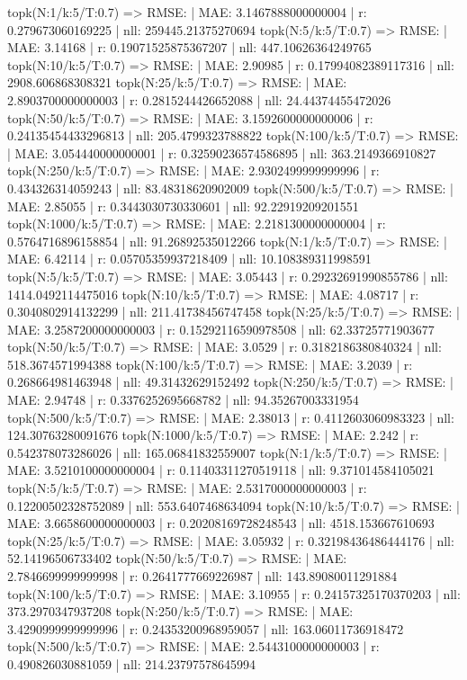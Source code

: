topk(N:1/k:5/T:0.7) => RMSE: | MAE: 3.1467888000000004 | r: 0.279673060169225 | nll: 259445.21375270694
topk(N:5/k:5/T:0.7) => RMSE: | MAE: 3.14168 | r: 0.19071525875367207 | nll: 447.10626364249765
topk(N:10/k:5/T:0.7) => RMSE: | MAE: 2.90985 | r: 0.17994082389117316 | nll: 2908.606868308321
topk(N:25/k:5/T:0.7) => RMSE: | MAE: 2.8903700000000003 | r: 0.2815244426652088 | nll: 24.44374455472026
topk(N:50/k:5/T:0.7) => RMSE: | MAE: 3.1592600000000006 | r: 0.24135454433296813 | nll: 205.4799323788822
topk(N:100/k:5/T:0.7) => RMSE: | MAE: 3.054440000000001 | r: 0.32590236574586895 | nll: 363.2149366910827
topk(N:250/k:5/T:0.7) => RMSE: | MAE: 2.9302499999999996 | r: 0.434326314059243 | nll: 83.48318620902009
topk(N:500/k:5/T:0.7) => RMSE: | MAE: 2.85055 | r: 0.3443030730330601 | nll: 92.22919209201551
topk(N:1000/k:5/T:0.7) => RMSE: | MAE: 2.2181300000000004 | r: 0.5764716896158854 | nll: 91.26892535012266
topk(N:1/k:5/T:0.7) => RMSE: | MAE: 6.42114 | r: 0.05705359937218409 | nll: 10.108389311998591
topk(N:5/k:5/T:0.7) => RMSE: | MAE: 3.05443 | r: 0.29232691990855786 | nll: 1414.0492114475016
topk(N:10/k:5/T:0.7) => RMSE: | MAE: 4.08717 | r: 0.3040802914132299 | nll: 211.41738456747458
topk(N:25/k:5/T:0.7) => RMSE: | MAE: 3.2587200000000003 | r: 0.15292116590978508 | nll: 62.33725771903677
topk(N:50/k:5/T:0.7) => RMSE: | MAE: 3.0529 | r: 0.3182186380840324 | nll: 518.3674571994388
topk(N:100/k:5/T:0.7) => RMSE: | MAE: 3.2039 | r: 0.268664981463948 | nll: 49.31432629152492
topk(N:250/k:5/T:0.7) => RMSE: | MAE: 2.94748 | r: 0.3376252695668782 | nll: 94.35267003331954
topk(N:500/k:5/T:0.7) => RMSE: | MAE: 2.38013 | r: 0.4112603060983323 | nll: 124.30763280091676
topk(N:1000/k:5/T:0.7) => RMSE: | MAE: 2.242 | r: 0.542378073286026 | nll: 165.06841832559007
topk(N:1/k:5/T:0.7) => RMSE: | MAE: 3.5210100000000004 | r: 0.11403311270519118 | nll: 9.371014584105021
topk(N:5/k:5/T:0.7) => RMSE: | MAE: 2.5317000000000003 | r: 0.12200502328752089 | nll: 553.6407468634094
topk(N:10/k:5/T:0.7) => RMSE: | MAE: 3.6658600000000003 | r: 0.20208169728248543 | nll: 4518.153667610693
topk(N:25/k:5/T:0.7) => RMSE: | MAE: 3.05932 | r: 0.32198436486444176 | nll: 52.14196506733402
topk(N:50/k:5/T:0.7) => RMSE: | MAE: 2.7846699999999998 | r: 0.2641777669226987 | nll: 143.89080011291884
topk(N:100/k:5/T:0.7) => RMSE: | MAE: 3.10955 | r: 0.24157325170370203 | nll: 373.2970347937208
topk(N:250/k:5/T:0.7) => RMSE: | MAE: 3.4290999999999996 | r: 0.24353200968959057 | nll: 163.06011736918472
topk(N:500/k:5/T:0.7) => RMSE: | MAE: 2.5443100000000003 | r: 0.490826030881059 | nll: 214.23797578645994
